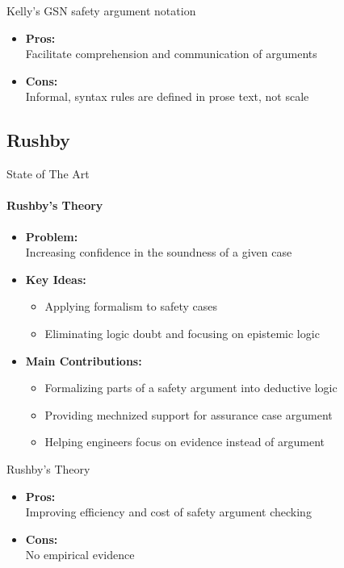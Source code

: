 \documentclass[xcolor=x11names,compress]{beamer}
\renewcommand{\(}{\begin{columns}}
\renewcommand{\)}{\end{columns}}
\newcommand{\<}[1]{\begin{column}{#1}}
\renewcommand{\>}{\end{column}}
\begin{document}
\begin{frame}{Kelly's GSN safety argument notation}
\begin{itemize}
\item \textbf{Pros:} \\
	Facilitate comprehension and communication of arguments
\item \textbf{Cons:} \\
	Informal, syntax rules are defined in prose text, not scale
\end{itemize}
\end{frame}

\subsection{Rushby}
\begin{frame}{State of The Art}
\framesubtitle{Rushby's Theory \cite{Rushby:formalism}}
\begin{itemize}
\item \textbf{Problem:}\\Increasing confidence in the soundness of a given case
\item \textbf{Key Ideas:}
			\begin{itemize}
			\item Applying formalism to safety cases
			\item Eliminating logic doubt and focusing on epistemic logic
			\end{itemize}
\item \textbf{Main Contributions:}
\begin{itemize}
	\item Formalizing parts of a safety argument into deductive logic
	\item Providing mechnized support for assurance case argument
	\item Helping engineers focus on evidence instead of argument
\end{itemize}
\end{itemize}
\end{frame}

\begin{frame}{Rushby's Theory}
\begin{itemize}
\item \textbf{Pros:} \\
	Improving efficiency and cost of safety argument checking
\item \textbf{Cons:} \\
	No empirical evidence
\end{itemize}
\end{frame}
\end{document}
